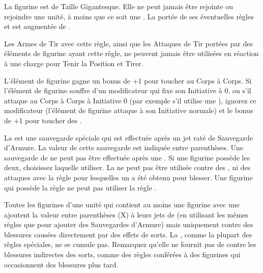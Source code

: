
La figurine est de Taille Gigantesque. Elle ne peut jamais être rejointe ou rejoindre une unité, à moins que ce soit une \warplatform{}. La portée de ses éventuelles règles \inspiringpresence{} et \holdyourground{} est augmentée de .


Les Armes de Tir avec cette règle, ainsi que les Attaques de Tir portées par des éléments de figurine ayant cette règle, ne peuvent jamais être utilisées en réaction à une charge pour Tenir la Position et Tirer.


L'élément de figurine gagne un bonus de +1 pour toucher au Corps à Corps. Si l'élément de figurine souffre d'un modificateur qui fixe son Initiative à 0, ou s'il attaque au Corps à Corps à Initiative 0 (par exemple s'il utilise une \gw{}), ignorez ce modificateur (l'élément de figurine attaque à son Initiative normale) et le bonus de +1 pour toucher des \lightningreflexes{}.


La \regeneration{} est une sauvegarde spéciale qui est effectuée après un jet raté de Sauvegarde d'Armure. La valeur de cette sauvegarde est indiquée entre parenthèses. Une sauvegarde de \regeneration{} ne peut pas être effectuée après une \wardsave{}. Si une figurine possède les deux, choisissez laquelle utiliser. La \regeneration{} ne peut pas être utilisée contre des \flamingattacks{}, ni des attaques avec la règle  pour lesquelles un  a été obtenu pour blesser. Une figurine qui possède la règle \fireborn{} ne peut pas utiliser la règle \regeneration{}.

\label{magicresistance}

Toutes les figurines d'une unité qui contient au moins une figurine avec une \magicresistance{} ajoutent la valeur entre parenthèses (X) à leurs jets de \wardsave{} (en utilisant les mêmes règles que pour ajouter des Sauvegardes d'Armure) mais uniquement contre des blessures causées directement par des effets de sorts. La \magicresistance{}, comme la plupart des règles spéciales, ne se cumule pas. Remarquez qu'elle ne fournit pas de \wardsave{} contre les blessures indirectes des sorts, comme des règles conférées à des figurines qui occasionnent des blessures plus tard.

